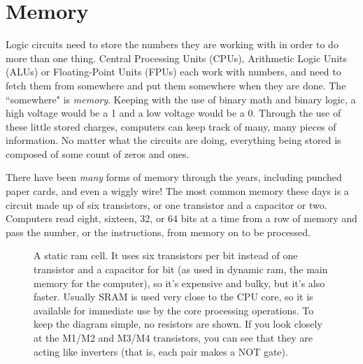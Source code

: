 \newpage
\section*{Memory}

Logic circuits need to store the numbers they are working with in order to do more than one thing. Central Processing Units (CPUs), Arithmetic Logic Units (ALUs) or Floating-Point Units (FPUs) each work with numbers, and need to fetch them from somewhere and put them somewhere when they are done. The ``somewhere" is \emph{memory}. Keeping with the use of binary math and binary logic, a high voltage would be a 1 and a low voltage would be a 0. Through the use of these little stored charges, computers can keep track of many, many pieces of information. No matter what the circuits are doing, everything being stored is composed of some count of zeros and ones. 

There have been \emph{many} forms of memory through the years, including punched paper cards, and even a wiggly wire! The most common memory these days is a circuit made up of six transistors, or one transistor and a capacitor or two. Computers read eight, sixteen, 32, or 64 bits at a time from a row of memory and pass the number, or the instructions, from memory on to be processed.


\begin{figure}[h!]
\begin{center}

\caption{A static ram cell. It uses six transistors per bit instead of one transistor and a capacitor for bit (as used in dynamic ram, the main memory for the computer), so it's expensive and bulky, but it's also faster. Usually SRAM is used very close to the CPU core, so it is available for immediate use by the core processing operations. To keep the diagram simple, no resistors are shown. If you look closely at the M1/M2 and M3/M4 transistors, you can see that they are acting like inverters (that is, each pair makes a NOT gate).} %
\end{center}
\end{figure}
